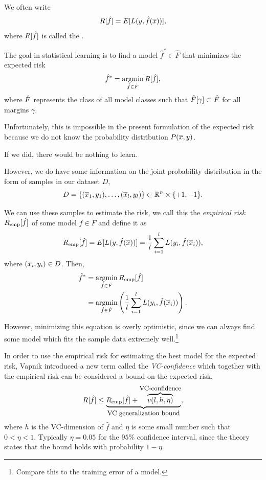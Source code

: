 \documentclass[a4paper,blends,pdf,colorBG,slideColor]{prosper}
\begin{document}
We often write
\begin{equation*}
R[\hat{f}] = E[L(y,\hat{f}(\overline{x}))],
\end{equation*}
where $R[\hat{f}]$ is called the .
\es

The goal in statistical learning
is to find a model $\hat{f}^* \in \hat{F}$ that minimizes the
expected risk 
\[
\hat{f}^* = \argmin_{\hat{f} \in \hat{F}}R[\hat{f}],
\]
where $\hat{F}$ represents the class of all model classes such
that $\hat{F}[\gamma] \subset \hat{F}$ for all margins $\gamma$.

Unfortunately, this is impossible in the
present formulation of the expected risk because we do not know the
probability distribution $P(\overline{x}, y)$.  

If we did, there would be nothing
to learn.  
\es

\small
However, we do have some information on the joint probability distribution
in the form of samples in our dataset $D$,
\begin{equation*}
D = \{(\overline{x}_1,y_1),\ldots,(\overline{x}_l,y_l)\} \subset \mathbb{R}^{n}\times \{+1,-1\}.
\end{equation*}

We can use these samples to
estimate the risk, we call this the {\em empirical risk} $R_{\text{emp}}[\hat{f}]$ of some
model $f \in F$ and define
it as
\begin{equation*}
R_{\text{emp}}[\hat{f}] = E[L(y, \hat{f}(\overline{x}))] = \frac{1}{l}\sum_{i = 1}^l L(y_i, \hat{f}(\overline{x}_i)),
\end{equation*}
where $(\overline{x}_i,y_i) \in D$.  Then,
\begin{align*}
\model{f}^* &= \argmin_{\model{f}\in\model{F}} R_{\text{emp}}[\model{f}] \\
\label{eq:min-empirical-risk}
	&= \argmin_{\model{f}\in\model{F}}  \left ( \frac{1}{l}\sum_{i = 1}^l L(y_i, \model{f}(\ol{x}_i)) \right ).
\end{align*}


However, minimizing this equation 
is overly optimistic, since we can always find some model which fits the
sample data extremely well.\footnote{Compare this to the training error of a model.}
\es

\small
In order to use the empirical risk for
estimating the best model for the expected risk, Vapnik introduced a new term
called the {\em VC-confidence} which together with the empirical risk can be
considered a bound on the expected risk,
\[
R[\hat{f}] \leq \underbrace{R_{\text{emp}}[\hat{f}] + \overbrace{v(l,h,\eta)}^{\mbox{\small VC-confidence}}}_{\mbox{\small VC generalization bound}},
\]
where $h$ is the VC-dimension of $\hat{f}$ and $\eta$ is some small number such that
$0 < \eta < 1$. Typically $\eta = 0.05$ for the $95\%$ confidence interval, since
the theory states that the bound holds with probability
$1 - \eta$.
\end{document}
